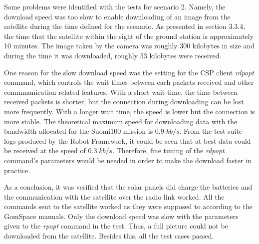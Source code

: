 \documentclass[english,12pt,a4paper,pdftex,elec,utf8]{aaltothesis}
\begin{document}
Some problems were identified with the tests for scenario 2. Namely, the download speed was too slow to enable downloading of an image from the satellite during the time defined for the scenario. As presented in section 3.3.4, the time that the satellite within the sight of the ground station is approximately 10 minutes. The image taken by the camera was roughly 300 kilobytes in size and during the time it was downloaded, roughly 53 kilobytes were received.\par 
One reason for the slow download speed was the setting for the CSP client \textit{rdpopt} command, which controls the wait times between each packets received and other commmunication related features. With a short wait time, the time between received packets is shorter, but the connection during downloading can be lost more frequently. With a longer wait time, the speed is lower but the connection is more stable. The theoretical maximum speed for downloading data with the bandwidth allocated for the Suomi100 mission is $0.9\; kb/s$. From the test suite logs produced by the Robot Framework, it could be seen that at best data could be received at the speed of $0.3\; kb/s$. Therefore, fine tuning of the \textit{rdpopt} command's parameters would be needed in order to make the download faster in practice.\par
As a conclusion, it was verified that the solar panels did charge the batteries and the communication with the satellite over the radio link worked. All the commands sent to the satellite worked as they were supposed to according to the GomSpace manuals. Only the download speed was slow with the parameters given to the \textit{rpopt} command in the test. Thus, a full picture could not be downloaded from the satellite. Besides this, all the test cases passed.\par      
\end{document}
